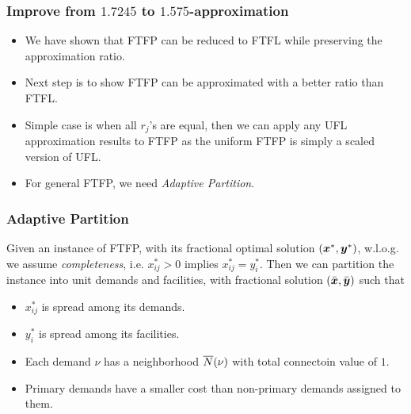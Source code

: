 \documentclass[hyperref, xcolor=dvipsnames]{beamer}
\begin{document}
\begin{frame}
  \frametitle{Improve from $1.7245$ to $1.575$-approximation}
  \begin{itemize}
  \item We have shown that FTFP can be reduced to FTFL while
    preserving the approximation ratio.
  \item Next step is to show FTFP can be approximated with a better
    ratio than FTFL.
  \item Simple case is when all $r_j$'s are equal, then we can apply
    any UFL approximation results to FTFP as the uniform FTFP is
    simply a scaled version of UFL.
  \item For general FTFP, we need \emph{Adaptive Partition}.
  \end{itemize}
\end{frame}

\begin{frame}
  \frametitle{Adaptive Partition} 

  Given an instance of FTFP, with its fractional optimal solution
  $(\boldsymbol{x}^\ast, \boldsymbol{y}^\ast)$, w.l.o.g. we assume \emph{completeness},
  i.e. $x_{ij}^\ast > 0$ implies $x_{ij} ^\ast = y_i^\ast$.  Then we
  can partition the instance into unit demands and facilities, with
  fractional solution $(\bar{\boldsymbol{x}}, \bar{\boldsymbol{y}})$ such that
  \begin{itemize}
  \item $x_{ij}^\ast$ is spread among its demands.
  \item $y_i^\ast$ is spread among its facilities.
  \item Each demand $\nu$ has a neighborhood ${\overline{N}}(\nu)$ with total
    connectoin value of $1$.
  \item Primary demands have a smaller cost than non-primary demands
    assigned to them.
  \end{itemize}
\end{frame}
\end{document}
